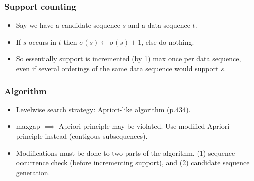 \documentclass{beamer}
\begin{document}
\begin{frame}
  \frametitle{Support counting}
  \begin{itemize}
    \item{Say we have a candidate sequence $s$ and a data sequence $t$.}
    \item{If $s$ occurs in $t$ then $\sigma(s) \leftarrow \sigma(s) + 1$, else
    do nothing.}
    \item{So essentially support is incremented (by 1) max once per data
    sequence, even if several orderings of the same data sequence would support
    $s$.}
  \end{itemize}
\end{frame}

\begin{frame}
  \frametitle{Algorithm}
  \begin{itemize}
    \item{Levelwise search strategy: Apriori-like algorithm (p.434).}
    \item{maxgap $\implies$ Apriori principle may be violated. Use modified
    Apriori principle instead (contigous subsequences).}
    \item{Modifications must be done to two parts of the algorithm. (1)
    sequence occurrence check (before incrementing support), and (2) candidate
    sequence generation.}
  \end{itemize}
\end{frame}
\end{document}
